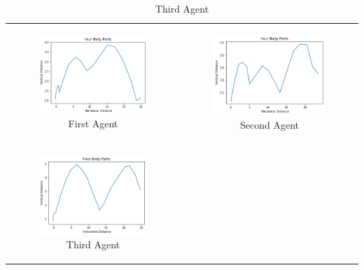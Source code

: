 \documentclass[12pt,oneside,listof=totoc,paper=a4,headings=small]{scrbook}
\begin{document}
{\centering
\begin{table}[ht]
\begin{tabular}{cc}
\begin{subfigure}{0.4\textwidth}\centering\includegraphics[width=0.75\columnwidth]{images/FourBodyParts.png}\caption{First Agent}\label{fig:fourplotpartsa}\end{subfigure}&
\begin{subfigure}{0.4\textwidth}\centering\includegraphics[width=0.75\columnwidth]{images/fourparts2.png}\caption{Second Agent}\label{fig:fourplotpartsb}\end{subfigure}\\
\newline
\begin{subfigure}{0.4\textwidth}\centering\includegraphics[width=0.75\columnwidth]{images/fourparts3.png}\caption{Third Agent}\label{fig:fourplotpartsc}\end{subfigure}&

\end{tabular}
\end{table}}
\end{document}
